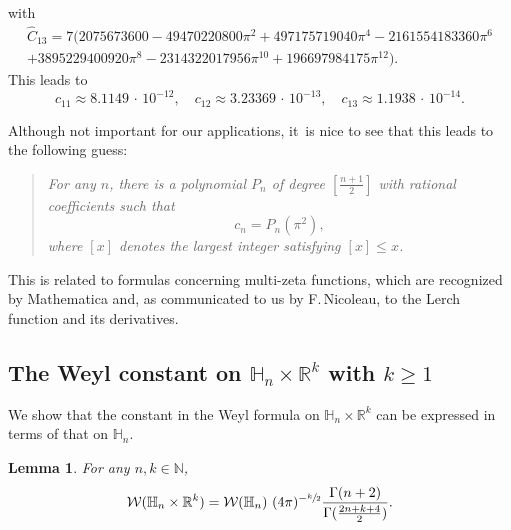 \documentclass[11pt]{article}
\let\oldsfrac\sfrac
\renewcommand{\sfrac}[2]{{\oldsfrac{#1}{#2}}}
\newtheorem{lemma}[theorem]{Lemma}
\theoremstyle{definition}
\newcommand{\1}{\mathbbm{1}}
\newcommand{\N}{\mathbb{N}}
\newcommand{\R}{\mathbb{R}}
\numberwithin{equation}{section}
\begin{document}
with
\begin{multline*}
\hat C_{13}= 7 \bigl(2075673600-49470220800 \pi ^2+497175719040 \pi ^4-2161554183360 \pi ^6\\
+3895229400920 \pi ^8-2314322017956 \pi ^{10}+196697984175
\pi ^{12}\bigr).
\end{multline*}
This leads to
\begin{equation*}
c_{11} \approx 8.1149\,\cdot\,10^{-12}, \quad
c_{12} \approx 3.23369\,\cdot\,10^{-13},\quad
c_{13} \approx 1.1938 \,\cdot\,10^{-14}.
\end{equation*}

Although not important for our applications, it~is nice to see that this leads to the following guess:
\begin{quotation}
{\it
For any $n$, there is a polynomial $P_n$ of degree $[\frac {n+1} 2]$ with rational coefficients such that
\[
c_n= P_n(\pi^2),
\]
where $ [x]$ denotes the largest integer satisfying $[x]\leq x$.
}
\end{quotation}
This is related to formulas concerning multi-zeta functions, which are recognized by Mathematica and, as communicated to us by F.\,Nicoleau, to the Lerch function \cite[p.\,32]{MOS} and its derivatives.

\subsection{The Weyl constant on $\mathbb H_n\times\R^k$ with $k\geq 1$}
We show that the constant in the Weyl formula on $\mathbb H_n\times\R^k$ can be expressed in terms of that on $\mathbb H_n$.

\begin{lemma}\label{wnk}
For any $n,k\in\N$,\vspace*{-3pt}
\begin{equation}
\label{eq:wnk}
\mathcal W(\mathbb H_n\times\R^k) = \mathcal W(\mathbb H_n)\ (4\pi)^{-\sfrac{k}{2}} \frac{\Gamma(n+2)}{\Gamma(\frac{2n+k+4}{2})}.
\end{equation}
\end{lemma}
\end{document}
